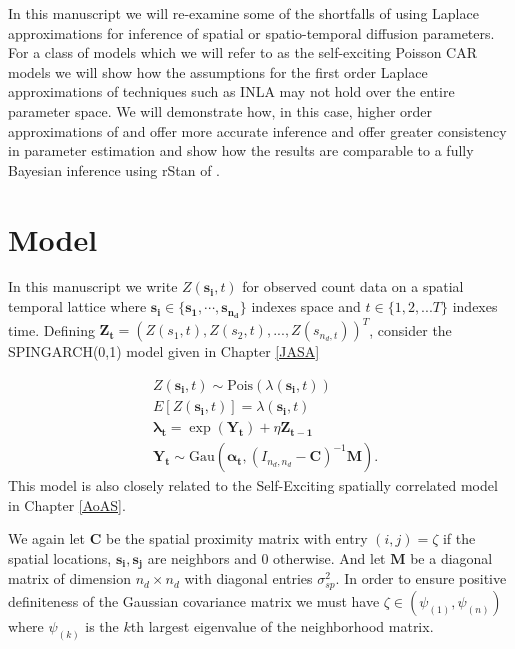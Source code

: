 \documentclass[11pt]{isuthesis}
\begin{document}
	In this manuscript we will re-examine some of the shortfalls of using Laplace approximations for inference of spatial or spatio-temporal diffusion parameters.  For a class of models which we will refer to as the self-exciting Poisson CAR models we will show how the assumptions for the first order Laplace approximations of techniques such as INLA may not hold over the entire parameter space.  We will demonstrate how, in this case, higher order approximations of \cite{shun1995laplace} and \cite{evangelou2011estimation} offer more accurate inference and offer greater consistency in parameter estimation and show how the results are comparable to a fully Bayesian inference using rStan of \cite{gelman2015stan}.
	
	
	\section{Model}
	
	
	
	
	
	In this manuscript we write $Z(\boldsymbol{s_i},t)$ for observed count data on a spatial temporal lattice where $\boldsymbol{s_i} \in \{\boldsymbol{s_1},\cdots,\boldsymbol{s_{n_d}}\}$ indexes space and $t\in\{1,2,...T\}$ indexes time.  Defining $\boldsymbol{Z_t} = (Z(s_1,t),Z(s_2,t),...,Z(s_{n_d,t}))^T$, consider the SPINGARCH(0,1) model given in Chapter \ref{JASA}
	
	\begin{align}
	& Z(\boldsymbol{s_i},t) \sim \mbox{Pois}(\lambda(\boldsymbol{s_i},t)) \label{eq:timeseries} \\
	& E[Z(\boldsymbol{s_i},t)]=\lambda(\boldsymbol{s_i},t)\\
	& \boldsymbol{\lambda_t} = \exp(\boldsymbol{Y_t})+\eta \boldsymbol{Z_{t-1}}\\
	& \boldsymbol{Y_t} \sim \mbox{Gau}\textit{} (\boldsymbol{\alpha_t},(I_{{n_d},{n_d}}-\boldsymbol{C})^{-1}\boldsymbol{M}).
	\end{align}
	This model is also closely related to the Self-Exciting spatially correlated model in Chapter \ref{AoAS}.
	
	We again let $\boldsymbol{C}$ be the spatial proximity matrix with entry $(i,j)=\zeta$ if the spatial locations, $\boldsymbol{s_i},\boldsymbol{s_j}$ are neighbors and $0$ otherwise.  And let $\boldsymbol{M}$ be a diagonal matrix of dimension $n_d \times n_d$ with diagonal entries $\sigma_{sp}^2$.  In order to ensure positive definiteness of the Gaussian covariance matrix we must have $\zeta \in (\psi_{(1)},\psi_{(n)})$ where $\psi_{(k)}$ is the $k$th largest eigenvalue of the neighborhood matrix.   
	
\end{document}
